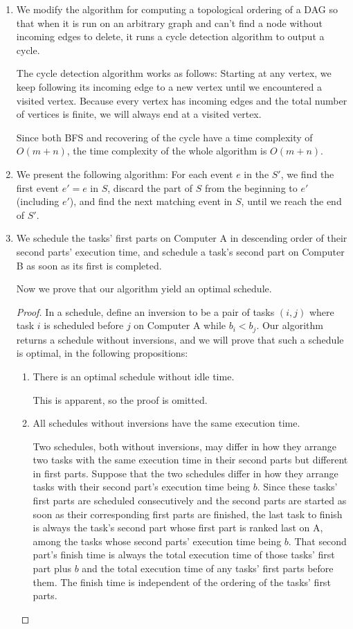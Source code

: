 \documentclass{article}
\begin{document}
\begin{enumerate}
\item We modify the algorithm for computing a topological ordering of a DAG so that when it is run on an arbitrary graph and can't find a node without incoming edges to delete, it runs a cycle detection algorithm to output a cycle.

The cycle detection algorithm works as follows: Starting at any vertex, we keep following its incoming edge to a new vertex until we encountered a visited vertex. Because every vertex has incoming edges and the total number of vertices is finite, we will always end at a visited vertex.

Since both BFS and recovering of the cycle have a time complexity of $O(m + n)$, the time complexity of the whole algorithm is $O(m + n)$.

\item We present the following algorithm: For each event $e$ in the $S'$, we find the first event $e' = e$ in $S$, discard the part of $S$ from the beginning to $e'$ (including $e'$), and find the next matching event in $S$, until we reach the end of $S'$.

\item We schedule the tasks' first parts on Computer A in descending order of their second parts' execution time, and schedule a task's second part on Computer B as soon as its first is completed.

Now we prove that our algorithm yield an optimal schedule.
\begin{proof}
    In a schedule, define an inversion to be a pair of tasks $(i, j)$ where task $i$ is scheduled before $j$ on Computer A while $b_i < b_j$. Our algorithm returns a schedule without inversions, and we will prove that such a schedule is optimal, in the following propositions:
    \begin{enumerate}
        \item There is an optimal schedule without idle time.
        
        This is apparent, so the proof is omitted.
    
        \item All schedules without inversions have the same execution time.
        
        Two schedules, both without inversions, may differ in how they arrange two tasks with the same execution time in their second parts but different in first parts. Suppose that the two schedules differ in how they arrange tasks with their second part's execution time being $b$. Since these tasks' first parts are scheduled consecutively and the second parts are started as soon as their corresponding first parts are finished, the last task to finish is always the task's second part whose first part is ranked last on A, among the tasks whose second parts' execution time being $b$. That second part's finish time is always the total execution time of those tasks' first part plus $b$ and the total execution time of any tasks' first parts before them. The finish time is independent of the ordering of the tasks' first parts.


\end{enumerate}
\end{proof}
\end{enumerate}
\end{document}
